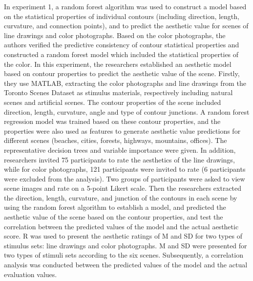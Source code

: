 \documentclass[
  man,floatsintext]{apa6}
\begin{document}
In experiment 1, a random forest algorithm was used to construct a model based on the statistical properties of individual contours (including direction, length, curvature, and connection points), and to predict the aesthetic value for scenes of line drawings and color photographs. Based on the color photographs, the authors verified the predictive consistency of contour statistical properties and constructed a random forest model which included the statistical properties of the color. In this experiment, the researchers established an aesthetic model based on contour properties to predict the aesthetic value of the scene. Firstly, they use MATLAB, extracting the color photographs and line drawings from the Toronto Scenes Dataset as stimulus materials, respectively including natural scenes and artificial scenes. The contour properties of the scene included direction, length, curvature, angle and type of contour junctions. A random forest regression model was trained based on these contour properties, and the properties were also used as features to generate aesthetic value predictions for different scenes (beaches, cities, forests, highways, mountains, offices). The representative decision trees and variable importance were given. In addition, researchers invited 75 participants to rate the aesthetics of the line drawings, while for color photographs, 121 participants were invited to rate (6 participants were excluded from the analysis). Two groups of participants were asked to view scene images and rate on a 5-point Likert scale. Then the researchers extracted the direction, length, curvature, and junction of the contours in each scene by using the random forest algorithm to establish a model, and predicted the aesthetic value of the scene based on the contour properties, and test the correlation between the predicted values of the model and the actual aesthetic score. R was used to present the aesthetic ratings of M and SD for two types of stimulus sets: line drawings and color photographs. M and SD were presented for two types of stimuli sets according to the six scenes. Subsequently, a correlation analysis was conducted between the predicted values of the model and the actual evaluation values.
\end{document}
